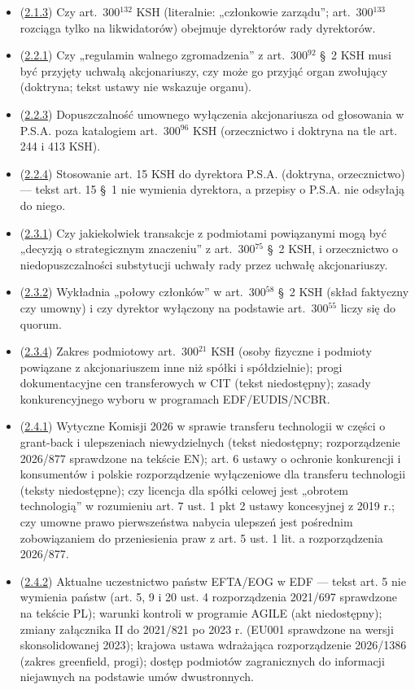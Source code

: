 \documentclass[12pt,a4paper]{report}
\begin{document}
\begin{itemize}
  \item (\hyperref[memo:2.1.3]{2.1.3}) Czy art.~300$^{132}$ KSH (literalnie: „członkowie zarządu”; art.~300$^{133}$ rozciąga tylko na likwidatorów) obejmuje dyrektorów rady dyrektorów.
  \item (\hyperref[memo:2.2.1]{2.2.1}) Czy „regulamin walnego zgromadzenia” z art.~300$^{92}$ §~2 KSH musi być przyjęty uchwałą akcjonariuszy, czy może go przyjąć organ zwołujący (doktryna; tekst ustawy nie wskazuje organu).
  \item (\hyperref[memo:2.2.3]{2.2.3}) Dopuszczalność umownego wyłączenia akcjonariusza od głosowania w P.S.A. poza katalogiem art.~300$^{96}$ KSH (orzecznictwo i doktryna na tle art. 244 i 413 KSH).
  \item (\hyperref[memo:2.2.4]{2.2.4}) Stosowanie art. 15 KSH do dyrektora P.S.A. (doktryna, orzecznictwo) — tekst art. 15 §~1 nie wymienia dyrektora, a przepisy o P.S.A. nie odsyłają do niego.
  \item (\hyperref[memo:2.3.1]{2.3.1}) Czy jakiekolwiek transakcje z podmiotami powiązanymi mogą być „decyzją o strategicznym znaczeniu” z art.~300$^{75}$ §~2 KSH, i orzecznictwo o niedopuszczalności substytucji uchwały rady przez uchwałę akcjonariuszy.
  \item (\hyperref[memo:2.3.2]{2.3.2}) Wykładnia „połowy członków” w art.~300$^{58}$ §~2 KSH (skład faktyczny czy umowny) i czy dyrektor wyłączony na podstawie art.~300$^{55}$ liczy się do quorum.
  \item (\hyperref[memo:2.3.4]{2.3.4}) Zakres podmiotowy art.~300$^{21}$ KSH (osoby fizyczne i podmioty powiązane z akcjonariuszem inne niż spółki i spółdzielnie); progi dokumentacyjne cen transferowych w CIT (tekst niedostępny); zasady konkurencyjnego wyboru w programach EDF/EUDIS/NCBR.
  \item (\hyperref[memo:2.4.1]{2.4.1}) Wytyczne Komisji 2026 w sprawie transferu technologii w części o grant-back i ulepszeniach niewydzielnych (tekst niedostępny; rozporządzenie 2026/877 sprawdzone na tekście EN); art. 6 ustawy o ochronie konkurencji i konsumentów i polskie rozporządzenie wyłączeniowe dla transferu technologii (teksty niedostępne); czy licencja dla spółki celowej jest „obrotem technologią” w rozumieniu art. 7 ust. 1 pkt 2 ustawy koncesyjnej z 2019 r.; czy umowne prawo pierwszeństwa nabycia ulepszeń jest pośrednim zobowiązaniem do przeniesienia praw z art. 5 ust. 1 lit. a rozporządzenia 2026/877.
  \item (\hyperref[memo:2.4.2]{2.4.2}) Aktualne uczestnictwo państw EFTA/EOG w EDF — tekst art. 5 nie wymienia państw (art. 5, 9 i 20 ust. 4 rozporządzenia 2021/697 sprawdzone na tekście PL); warunki kontroli w programie AGILE (akt niedostępny); zmiany załącznika II do 2021/821 po 2023 r. (EU001 sprawdzone na wersji skonsolidowanej 2023); krajowa ustawa wdrażająca rozporządzenie 2026/1386 (zakres greenfield, progi); dostęp podmiotów zagranicznych do informacji niejawnych na podstawie umów dwustronnych.

\end{itemize}
\end{document}
